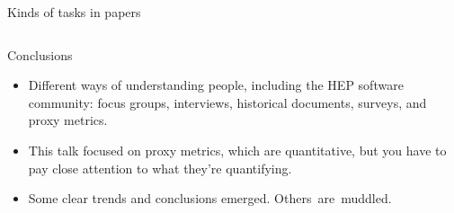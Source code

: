 \documentclass[aspectratio=169]{beamer}
\begin{document}
\begin{frame}{Kinds of tasks in  papers}
\vspace{0.35 cm}

\begin{columns}
\end{columns}
\end{frame}

\begin{frame}{Conclusions}
\Large
\vspace{0.5 cm}
\begin{itemize}\setlength{\itemsep}{0.5 cm}
\item Different ways of understanding people, including the HEP software community: focus groups, interviews, historical documents, surveys, and proxy metrics.

\item This talk focused on proxy metrics, which are quantitative, but you have to pay close attention to what they're quantifying.

\item Some clear trends and conclusions emerged. \mbox{Others are muddled.\hspace{-1 cm}}
\end{itemize}
\end{frame}
\end{document}
